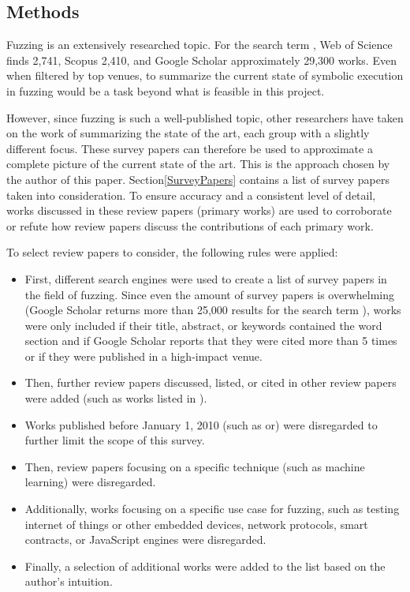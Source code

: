 \documentclass{article}
\begin{document}
\begin{multicols}{2}
    \section{Methods}
    \label{Methods}
    Fuzzing is an extensively researched topic. For the search term , Web of Science\cite{WebOfScience} finds 2,741, Scopus\cite{Scopus} 2,410, and Google Scholar\cite{GoogleScholar} approximately 29,300 works. Even when filtered by top venues, to summarize the current state of symbolic execution in fuzzing would be a task beyond what is feasible in this project.

    However, since fuzzing is such a well-published topic, other researchers have taken on the work of summarizing the state of the art, each group with a slightly different focus. These survey papers can therefore be used to approximate a complete picture of the current state of the art. This is the approach chosen by the author of this paper. Section\ref{SurveyPapers} contains a list of survey papers taken into consideration. To ensure accuracy and a consistent level of detail, works discussed in these review papers (primary works) are used to corroborate or refute how review papers discuss the contributions of each primary work.

    To select review papers to consider, the following rules were applied:
    \begin{itemize}
        \item First, different search engines were used to create a list of survey papers in the field of fuzzing. Since even the amount of survey papers is overwhelming (Google Scholar\cite{GoogleScholar} returns more than 25,000 results for the search term ), works were only included if their title, abstract, or keywords contained the word section  and if Google Scholar\cite{GoogleScholar} reports that they were cited more than 5 times or if they were published in a high-impact venue.
        \item Then, further review papers discussed, listed, or cited in other review papers were added (such as works listed in \cite{Demystifying}).
        \item Works published before January 1, 2010 (such as\cite{ViolatingAssumptionsWithFuzzing} or\cite{NewTrendsSymbex}) were disregarded to further limit the scope of this survey.
        \item Then, review papers focusing on a specific technique (such as machine learning\cite{ML1, ML2}) were disregarded.
        \item Additionally, works focusing on a specific use case for fuzzing, such as testing internet of things or other embedded devices\cite{IoT, Embedded, Embedded2}, network protocols\cite{Network, Network2023}, smart contracts\cite{Ethereum}, or JavaScript engines\cite{JavaScript, JavaScript2} were disregarded.
        \item Finally, a selection of additional works were added to the list based on the author's intuition.
    \end{itemize}


\end{multicols}
\end{document}

